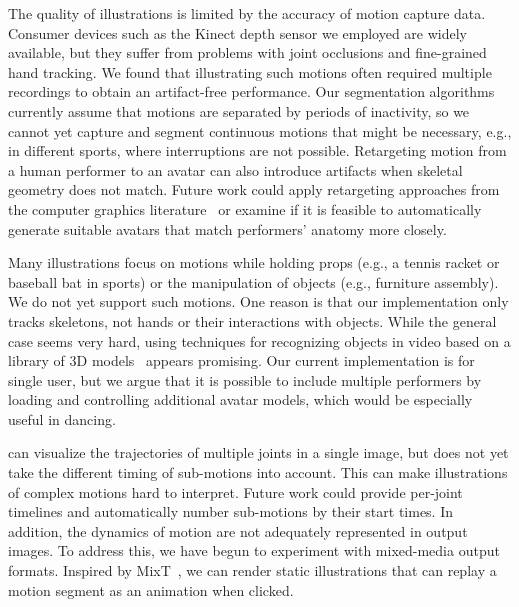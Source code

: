  The quality of \systemname{} illustrations is limited by the accuracy of motion capture data.
%
Consumer devices such as the Kinect depth sensor we employed are widely available, but they  suffer from problems with joint occlusions and fine-grained hand tracking. We found that illustrating such motions often required multiple recordings to obtain an artifact-free performance.
%
Our segmentation algorithms currently assume that motions are separated by periods of inactivity, so we cannot yet capture and segment continuous motions that might be necessary, e.g., in different sports, where interruptions are not possible.
%
Retargeting motion from a human performer to an avatar can also introduce artifacts when skeletal geometry does not match. Future work could apply retargeting approaches from the computer graphics literature~\cite{gleicher1998retargetting} or examine if it is feasible to automatically generate suitable avatars that match performers' anatomy more closely.

 Many illustrations focus on motions while holding props (e.g., a tennis racket or baseball bat in sports) or the manipulation of objects (e.g., furniture assembly). We do not yet support such motions. One reason is that our implementation only tracks skeletons, not hands or their interactions with objects. While the general case seems very hard, using techniques for recognizing objects in video based on a library of 3D models~\cite{kholgade20143d} appears promising.
%
Our current implementation is for single user, but we argue that it is possible to include multiple performers by loading and controlling additional avatar models, which would be especially useful in dancing.

 \systemname{} can visualize the trajectories of multiple joints in a single image, but does not yet take the different timing of sub-motions into account. This can make illustrations of complex motions hard to interpret. Future work could provide per-joint timelines and automatically number sub-motions by their start times. In addition, the dynamics of motion are not adequately represented in output images. To address this, we have begun to experiment with mixed-media output formats. Inspired by MixT~\cite{chi2012mixt}, we can render static illustrations that can replay a motion segment as an animation when clicked.


